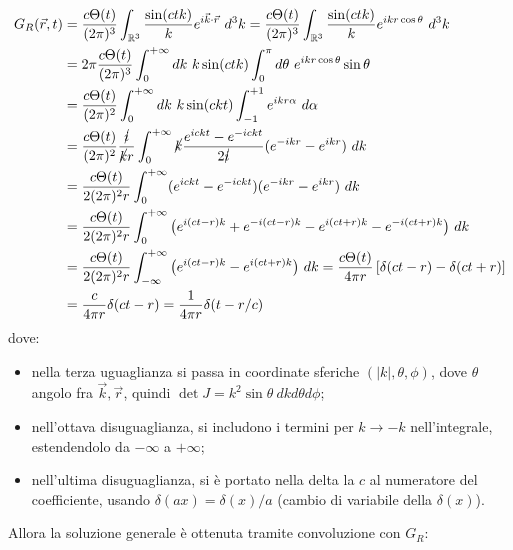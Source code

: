 \documentclass[10pt, a4paper]{scrartcl}
\numberwithin{equation}{subsection}
\theoremstyle{style1}
\begin{document}
\begin{equation}
	\begin{split}
		G_R(\vec{r},t) &= \frac{c\Theta(t)}{(2\pi)^3} \int_{\mathbb{R}^3} \frac{\sin(ctk)}{k} e^{i\vec{k}\cdot \vec{r}} \ d^3k=\frac{c\Theta(t)}{(2\pi)^3} \int_{\mathbb{R}^3} \frac{\sin(ctk)}{k} e^{ikr \cos\theta } \ d^3k\\
			       &=2\pi\frac{c\Theta(t)}{(2\pi)^3} \int_{0} ^{+\infty} dk \ k \sin(ctk) \int_{0} ^\pi d\theta  \ e^{ikr \cos \theta } \sin \theta \\
			       &= \frac{c\Theta(t)}{(2\pi)^2} \int_{0} ^{+\infty} dk \ k \sin(ckt) \int_{-1} ^{+1} e^{ikr\alpha } \ d\alpha \\
			       &= \frac{c\Theta(t)}{(2\pi)^2} \frac{\cancel{i}}{\cancel{k}r}\int_{0} ^{+\infty} \cancel{k} \frac{e^{i ckt} - e^{-ickt} }{2\cancel{i}} (e^{-ikr} - e^{ikr}  ) \ dk\\
			       &= \frac{c\Theta(t)}{2(2\pi)^2r} \int_{0} ^{+\infty} (e^{i ckt} - e^{-ickt}) (e^{-ikr} - e^{ikr}  ) \ dk\\
			       &=\frac{c\Theta(t)}{2(2\pi)^2r} \int_{0} ^{+\infty}\big(e^{i(ct-r)k} + e^{-i(ct-r) k} - e^{i(ct+r)k} -e^{-i(ct+r)k}\big) \ dk \\
			       &=\frac{c\Theta(t)}{2(2\pi)^2r} \int_{-\infty} ^{+\infty}\big(e^{i(ct-r)k}  - e^{i(ct+r)k} \big) \ dk = \frac{c\Theta(t)}{4\pi r} \left[ \delta (ct-r) - \delta (ct+r) \right] \\
			       &=\frac{c}{4\pi r} \delta (ct-r)= \frac{1}{4\pi r} \delta (t - r / c)
	\end{split}
\end{equation}
dove:
\begin{itemize}
	\item nella terza uguaglianza si passa in coordinate sferiche $(\left\lvert k  \right\rvert, \theta ,\phi )$, dove $\theta $ angolo fra $\vec{k},\vec{r}$, quindi $\det J = k^2 \sin\theta \ dk d \theta  d\phi $;
	\item nell'ottava disuguaglianza, si includono i termini per $k\to -k$ nell'integrale, estendendolo da $-\infty$ a $+\infty$;
	\item nell'ultima disuguaglianza, si \`e portato nella delta la $c$ al numeratore del coefficiente, usando $\delta (ax) = \delta (x) / a$ (cambio di variabile della $\delta(x) $).
\end{itemize}
Allora la soluzione generale \`e ottenuta tramite convoluzione con $G_R$:
\end{document}
